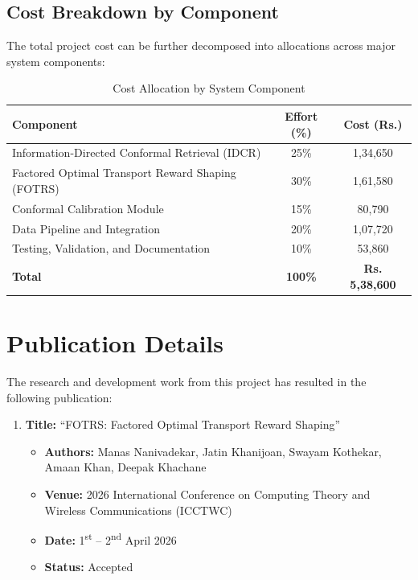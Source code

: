 \documentclass[12pt,a4paper,oneside]{report}
\theoremstyle{definition}
\theoremstyle{remark}
\begin{document}
\begin{appendices}
\section{Cost Breakdown by Component}

The total project cost can be further decomposed into allocations across major system components:

\begin{table}[H]
\centering
\caption{Cost Allocation by System Component}
\begin{tabular}{|l|c|c|}
\hline
\textbf{Component} & \textbf{Effort (\%)} & \textbf{Cost (Rs.)} \\
\hline
Information-Directed Conformal Retrieval (IDCR) & 25\% & 1,34,650 \\
Factored Optimal Transport Reward Shaping (FOTRS) & 30\% & 1,61,580 \\
Conformal Calibration Module & 15\% & 80,790 \\
Data Pipeline and Integration & 20\% & 1,07,720 \\
Testing, Validation, and Documentation & 10\% & 53,860 \\
\hline
\textbf{Total} & \textbf{100\%} & \textbf{Rs. 5,38,600} \\
\hline
\end{tabular}
\end{table}

\chapter{Publication Details}
The research and development work from this project has resulted in the following publication:

\begin{enumerate}
    \item \textbf{Title:} ``FOTRS: Factored Optimal Transport Reward Shaping''
    \begin{itemize}
        \item \textbf{Authors:} Manas Nanivadekar, Jatin Khanijoan, Swayam Kothekar, Amaan Khan, Deepak Khachane
        \item \textbf{Venue:} 2026 International Conference on Computing Theory and Wireless Communications (ICCTWC)
        \item \textbf{Date:} 1\textsuperscript{st} -- 2\textsuperscript{nd} April 2026
        \item \textbf{Status:} Accepted
    \end{itemize}
\end{enumerate}

\end{appendices}



\end{document}
